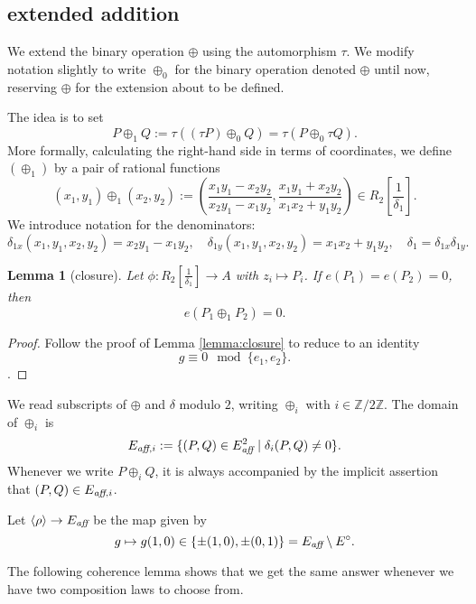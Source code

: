 \documentclass[12pt]{article}
\newtheorem{lemma}[theorem]{Lemma}
\newcommand{\ring}[1]{\mathbb{#1}}
\newcommand{\op}[1]{\hbox{#1}}
\newcommand{\f}[1]{\frac{1}{#1}}
\newcommand{\Eaff}{E_{\op{\scriptsize\it aff}}}
\newcommand{\Eaf}[1]{E_{\op{\scriptsize\it aff},{#1}}}
\newcommand{\Eoo}{E^{\circ}}
\newcommand{\ang}[1]{\langle{#1}\rangle}
\def\cong{\equiv}
\begin{document}
\subsection{extended addition}

We extend the binary operation $\oplus$ using the automorphism $\tau$.
We modify notation slightly to write $\oplus_0$ for the binary
operation denoted $\oplus$ until now, reserving $\oplus$ for the
extension about to be defined.

The idea is to
set 
\begin{equation}\label{eqn:tauplus}
P\oplus_1 Q := \tau((\tau P)\oplus_0 Q) = \tau(P\oplus_0 \tau Q).
\end{equation}
More formally, calculating the right-hand side in terms of
coordinates, we define $(\oplus_1)$ by a pair of rational functions
\[
(x_1,y_1)\oplus_1 (x_2,y_2) := \left(\frac{x_1y_1 - x_2 y_2}{x_2
    y_1-x_1 y_2},\frac{x_1 y_1 + x_2 y_2}{x_1 x_2 + y_1 y_2}\right) 
    \in R_2[\f{\delta_1}].
\]
We introduce notation for the denominators:
\[
\delta_{1x}(x_1,y_1,x_2,y_2) = x_2 y_1 - x_1 y_2,
\quad \delta_{1y}(x_1,y_1,x_2,y_2)= x_1 x_2 + y_1 y_2,
\quad \delta_1 = \delta_{1x} \delta_{1y}.
\] 
\smallskip


\begin{lemma}[closure]
  Let $\phi:R_2[\f{\delta_1}]\to A$ with $z_i\mapsto P_i$.  If
  $e(P_1)=e(P_2)=0$, then
  \[
  e(P_1\oplus_1 P_2) = 0.
  \]
\end{lemma}

\begin{proof} Follow the proof of Lemma \ref{lemma:closure} to reduce
  to an identity
\[
g\cong 0 \mod \{e_1,e_2\}.
\].
\end{proof}


We read subscripts of $\oplus$ and $\delta$
modulo $2$, writing $\oplus_i$ with $i\in\ring{Z}/2\ring{Z}$.
The domain of $\oplus_i$ is
\[
\Eaf{i} := \{(P,Q)\in \Eaff^2\mid \delta_i(P,Q)\ne0\}.
\]
Whenever we write $P\oplus_i Q$, it is always accompanied by
the implicit assertion that 
$(P,Q)\in \Eaf{i}$.

Let $\ang{\rho}\to \Eaff$ be the map given by 
\[
g\mapsto g(1,0)\in\{\pm (1,0),\pm (0,1)\} = \Eaff\setminus \Eoo.
\]

The following coherence lemma shows that we get the same answer
whenever we have two composition laws to choose from.
\end{document}
